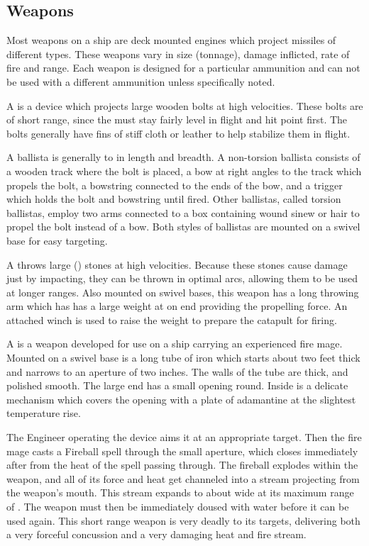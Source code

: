 \begin{multicols*}{2}
\subsection{Weapons}
Most weapons on a ship are deck mounted engines which project missiles of different types. These weapons vary in size (tonnage), damage inflicted, rate of fire and range. Each weapon is designed for a particular ammunition and can not be used with a different ammunition unless specifically noted.

A  is a device which projects large wooden bolts at high velocities. These bolts are of short range, since the must stay fairly level in flight and hit point first. The bolts generally have fins of stiff cloth or leather to help stabilize them in flight.

A ballista is generally  to  in length and breadth. A non-torsion ballista consists of a wooden track where the bolt is placed, a bow at right angles to the track which propels the bolt, a bowstring connected to the ends of the bow, and a trigger which holds the bolt and bowstring until fired. Other ballistas, called torsion ballistas, employ two arms connected to a box containing wound sinew or hair to propel the bolt instead of a bow. Both styles of ballistas are mounted on a swivel base for easy targeting.

A  throws large () stones at high velocities. Because these stones cause damage just by impacting, they can be thrown in optimal arcs, allowing them to be used at longer ranges. Also mounted on swivel bases,
this weapon has a long throwing arm which has has a large weight at on end providing the propelling force. An attached winch is used to raise the weight to prepare the catapult for firing.

A  is a weapon developed for use on a ship carrying an experienced fire mage. Mounted on a swivel base is a  long tube of iron which starts about two feet thick and narrows to an aperture of two inches. The walls of the tube are  thick, and polished smooth. The large end has a small opening  round. Inside is a delicate mechanism which covers the opening with a plate of adamantine at the slightest temperature rise.

The Engineer operating the device aims it at an appropriate target. Then the fire mage casts a Fireball spell through the small aperture, which closes immediately after from the heat of the spell passing through. The fireball explodes within the weapon, and all of its force and heat get channeled into a  stream projecting from the weapon’s mouth. This stream expands to about  wide at its maximum range of . The weapon must then be immediately doused with water before it can be used again. This short range weapon is very deadly to its targets, delivering both a very forceful concussion and a very damaging heat and fire stream. 


\end{multicols*}
